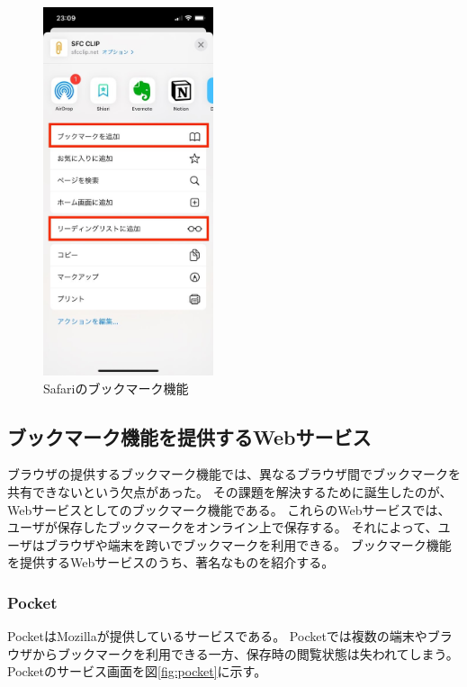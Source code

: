 \begin{figure}[htbp]
  \label{fig:safari-bookmark}
  \begin{center}
    \includegraphics[bb=0 0 585 1266,width=5cm]{img/020_related_works/safari-bookmark.pdf}
  \end{center}
  \caption{Safariのブックマーク機能}
\end{figure}

\subsection{ブックマーク機能を提供するWebサービス}
ブラウザの提供するブックマーク機能では、異なるブラウザ間でブックマークを共有できないという欠点があった。
その課題を解決するために誕生したのが、Webサービスとしてのブックマーク機能である。
これらのWebサービスでは、ユーザが保存したブックマークをオンライン上で保存する。
それによって、ユーザはブラウザや端末を跨いでブックマークを利用できる。
ブックマーク機能を提供するWebサービスのうち、著名なものを紹介する。

\subsubsection{Pocket}
PocketはMozilla\cite{mozilla}が提供しているサービスである。
Pocketでは複数の端末やブラウザからブックマークを利用できる一方、保存時の閲覧状態は失われてしまう。
Pocketのサービス画面を図\ref{fig:pocket}に示す。

